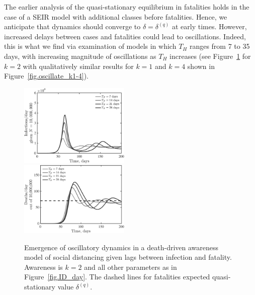 The earlier analysis of
the quasi-stationary equilibrium in fatalities holds in the
case of a SEIR model with additional classes before
fatalities. Hence,
we anticipate that dynamics should converge to $\delta=\delta^{(q)}$
at early times. However, increased delays between cases and
fatalities could lead to oscillations.  Indeed, this
is what we find via examination of models in which
$T_H$ ranges from 7 to 35 days, with increasing magnitude of
oscillations as $T_H$ increases (see Figure~\ref{fig.oscillate} 
for $k=2$ with qualitatively similar results for $k=1$ and
$k=4$ shown in Figure~\ref{fig.oscillate_k1-4}).

\begin{figure}[t!]
\begin{center}
\includegraphics[width=0.47\textwidth]{scripts/figseir_Hdel_k2_noname.pdf}\\
\includegraphics[width=0.47\textwidth]{scripts/figseir_Hdel_k2D_noname.pdf}
\caption{Emergence of oscillatory dynamics in a death-driven awareness
model of social distancing given lags between infection and fatality.
Awareness is $k=2$ and all other parameters as in Figure~\ref{fig.ID_day}.
The dashed
lines for fatalities expected quasi-stationary value $\delta^{(q)}$.
\label{fig.oscillate}}
\end{center}
\end{figure}


